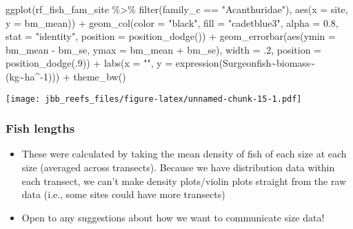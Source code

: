 \documentclass[
]{article}
\newenvironment{Shaded}{\begin{snugshade}}{\end{snugshade}}
\newcommand{\AttributeTok}[1]{\textcolor[rgb]{0.77,0.63,0.00}{#1}}
\newcommand{\DecValTok}[1]{\textcolor[rgb]{0.00,0.00,0.81}{#1}}
\newcommand{\FloatTok}[1]{\textcolor[rgb]{0.00,0.00,0.81}{#1}}
\newcommand{\FunctionTok}[1]{\textcolor[rgb]{0.00,0.00,0.00}{#1}}
\newcommand{\NormalTok}[1]{#1}
\newcommand{\SpecialCharTok}[1]{\textcolor[rgb]{0.00,0.00,0.00}{#1}}
\newcommand{\StringTok}[1]{\textcolor[rgb]{0.31,0.60,0.02}{#1}}
\providecommand{\tightlist}{%
  \setlength{\itemsep}{0pt}\setlength{\parskip}{0pt}}
\begin{document}
\begin{Shaded}
\begin{Highlighting}[]
\FunctionTok{ggplot}\NormalTok{(rf\_fish\_fam\_site }\SpecialCharTok{\%\textgreater{}\%}
        \FunctionTok{filter}\NormalTok{(family\_c }\SpecialCharTok{==} \StringTok{"Acanthuridae"}\NormalTok{),}
       \FunctionTok{aes}\NormalTok{(}\AttributeTok{x =}\NormalTok{ site, }\AttributeTok{y =}\NormalTok{ bm\_mean)) }\SpecialCharTok{+}
  \FunctionTok{geom\_col}\NormalTok{(}\AttributeTok{color =} \StringTok{"black"}\NormalTok{, }\AttributeTok{fill =} \StringTok{"cadetblue3"}\NormalTok{, }\AttributeTok{alpha =} \FloatTok{0.8}\NormalTok{, }\AttributeTok{stat =} \StringTok{"identity"}\NormalTok{, }\AttributeTok{position =} \FunctionTok{position\_dodge}\NormalTok{()) }\SpecialCharTok{+}
  \FunctionTok{geom\_errorbar}\NormalTok{(}\FunctionTok{aes}\NormalTok{(}\AttributeTok{ymin =}\NormalTok{ bm\_mean }\SpecialCharTok{{-}}\NormalTok{ bm\_se, }\AttributeTok{ymax =}\NormalTok{ bm\_mean }\SpecialCharTok{+}\NormalTok{ bm\_se), }\AttributeTok{width =}\NormalTok{ .}\DecValTok{2}\NormalTok{,}
                 \AttributeTok{position =} \FunctionTok{position\_dodge}\NormalTok{(.}\DecValTok{9}\NormalTok{)) }\SpecialCharTok{+}
  \FunctionTok{labs}\NormalTok{(}\AttributeTok{x =} \StringTok{""}\NormalTok{, }\AttributeTok{y =} \FunctionTok{expression}\NormalTok{(Surgeonfish}\SpecialCharTok{\textasciitilde{}}\NormalTok{biomass}\SpecialCharTok{\textasciitilde{}}\NormalTok{(kg}\SpecialCharTok{\textasciitilde{}}\NormalTok{ha}\SpecialCharTok{\^{}{-}}\DecValTok{1}\NormalTok{))) }\SpecialCharTok{+}
  \FunctionTok{theme\_bw}\NormalTok{()}
\end{Highlighting}
\end{Shaded}

\texttt{[image: jbb\_reefs\_files/figure-latex/unnamed-chunk-15-1.pdf]}

\hypertarget{fish-lengths}{%
\subsubsection{Fish lengths}\label{fish-lengths}}

\begin{itemize}
\tightlist
\item
  These were calculated by taking the mean density of fish of each size
  at each size (averaged across transects). Because we have distribution
  data within each transect, we can't make density plots/violin plots
  straight from the raw data (i.e., some sites could have more
  transects)
\item
  Open to any suggestions about how we want to communicate size data!
\end{itemize}
\end{document}
